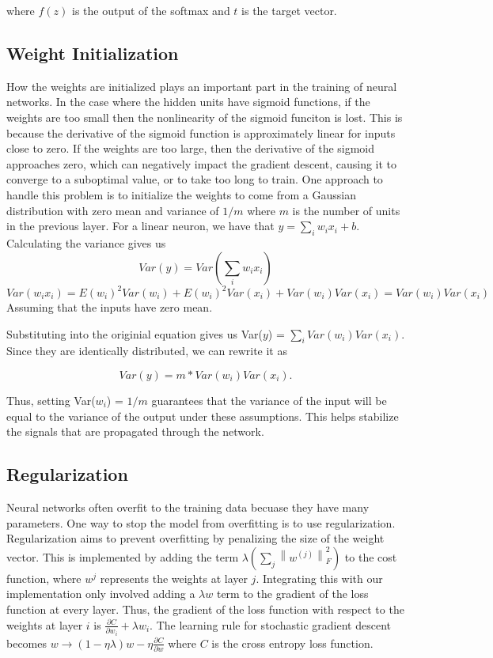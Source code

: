 \documentclass[10pt,twoside]{article}
\begin{document}
where $f(z)$ is the output of the softmax and $t$ is the target vector. 

\subsection{Weight Initialization}

How the weights are initialized plays an important part in the training of neural networks. In the case where the hidden units have sigmoid functions, if the weights are too small then the nonlinearity of the sigmoid funciton is lost. This is because the derivative of the sigmoid function is approximately linear for inputs close to zero. If the weights are too large, then the derivative of the sigmoid approaches zero, which can negatively impact the gradient descent, causing it to converge to a suboptimal value, or to take too long to train. One approach to handle this problem is to initialize the weights to come from a Gaussian distribution with zero mean and variance of $1/m$ where $m$ is the number of units in the previous layer. For a linear neuron, we have that 
$y = \sum_i w_i x_i +b$. 
Calculating the variance gives us 
\begin{equation}
Var(y) = Var(\sum_i w_i x_i) 
\end{equation}
\begin{equation}
Var(w_i x_i) = E(w_i)^2Var(w_i) + E(w_i)^2Var(x_i) + Var(w_i)Var(x_i) = Var(w_i)Var(x_i)
\end{equation}
Assuming that the inputs have zero mean.  

Substituting into the originial equation gives us 
Var($y$) = $\sum_i Var(w_i)Var(x_i)$. 
Since they are identically distributed, we can rewrite it as 

\begin{equation}
Var(y) = m*Var(w_i)Var(x_i).
\end{equation} 

Thus, setting Var($w_i$) = $1/m$ guarantees that the variance of the input will be equal to the variance of the output under these assumptions. This helps stabilize the signals that are propagated through the network. 

\subsection{Regularization}

Neural networks often overfit to the training data becuase they have many parameters. One way to stop the model from overfitting is to use regularization. Regularization aims to prevent overfitting by penalizing the size of the weight vector. This is implemented by adding the term $\lambda (\sum_j  \left \|w^{(j)}  \right \|^2_F )$ to the cost function, where $w^{j}$ represents the weights at layer $j$. Integrating this with our implementation only involved adding a $\lambda w$ term to the gradient of the loss function at every layer. Thus, the gradient of the loss function with respect to the weights at layer $i$ is $\frac{\partial C}{\partial w_i} + \lambda w_i$. The learning rule for stochastic gradient descent becomes $w \rightarrow (1- \eta \lambda)w - \eta \frac{\partial C}{\partial w} $ where $C$ is the cross entropy loss function.
\end{document}
